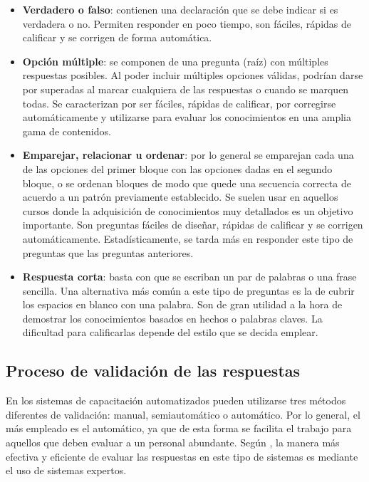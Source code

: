 \begin{itemize}
\item \textbf{Verdadero o falso}: contienen una declaración que se debe indicar si es verdadera o no. Permiten responder en poco tiempo, son fáciles, rápidas de calificar y se corrigen de forma automática.
\item \textbf{Opción múltiple}: se componen de una pregunta (raíz) con múltiples respuestas posibles. Al poder incluir múltiples opciones válidas, podrían darse por superadas al marcar cualquiera de las respuestas o cuando se marquen todas. Se caracterizan por ser fáciles, rápidas de calificar, por corregirse automáticamente y utilizarse para evaluar los conocimientos en una amplia gama de contenidos.
\item \textbf{Emparejar, relacionar u ordenar}: por lo general se emparejan cada una de las opciones del primer bloque con las opciones dadas en el segundo bloque, o se ordenan bloques de modo que quede una secuencia correcta de acuerdo a un patrón previamente establecido. Se suelen usar en aquellos cursos donde la adquisición de conocimientos muy detallados es un objetivo importante. Son preguntas fáciles de diseñar, rápidas de calificar y se corrigen automáticamente. Estadísticamente, se tarda más en responder este tipo de preguntas que las preguntas anteriores.
\item \textbf{Respuesta corta}: basta con que se escriban un par de palabras o una frase sencilla. Una alternativa más común a este tipo de preguntas es la de cubrir los espacios en blanco con una palabra. Son de gran utilidad a la hora de demostrar los conocimientos basados en hechos o palabras claves. La dificultad para calificarlas depende del estilo que se decida emplear.
\end{itemize}

\subsection{Proceso de validación de las respuestas}
En los sistemas de capacitación automatizados pueden utilizarse tres métodos diferentes de validación: manual, semiautomático o automático. Por lo general, el más empleado es el automático, ya que de esta forma se facilita el trabajo para aquellos que deben evaluar a un personal abundante. Según \cite{AltyJames1984}, la manera más efectiva y eficiente de evaluar las respuestas en este tipo de sistemas es mediante el uso de sistemas expertos.